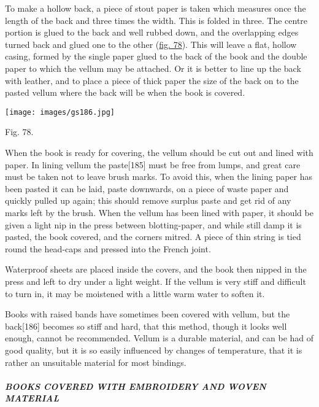 \documentclass[
]{article}
\begin{document}
To make a hollow back, a piece of stout paper is taken which measures
once the length of the back and three times the width. This is folded in
three. The centre portion is glued to the back and well rubbed down, and
the overlapping edges turned back and glued one to the other
(\protect\hyperlink{Fig_78}{fig. 78}). This will leave a flat, hollow
casing, formed by the single paper glued to the back of the book and the
double paper to which the vellum may be attached. Or it is better to
line up the back with leather, and to place a piece of thick paper the
size of the back on to the pasted vellum where the back will be when the
book is covered.

\protect\hypertarget{Fig_78}{}{}
\texttt{[image: images/gs186.jpg]}

Fig. 78.

When the book is ready for covering, the vellum should be cut out and
lined with paper. In lining vellum the
paste{\protect\hypertarget{Page_185}{}{{[}185{]}}} must be free from
lumps, and great care must be taken not to leave brush marks. To avoid
this, when the lining paper has been pasted it can be laid, paste
downwards, on a piece of waste paper and quickly pulled up again; this
should remove surplus paste and get rid of any marks left by the brush.
When the vellum has been lined with paper, it should be given a light
nip in the press between blotting-paper, and while still damp it is
pasted, the book covered, and the corners mitred. A piece of thin string
is tied round the head-caps and pressed into the French joint.

Waterproof sheets are placed inside the covers, and the book then nipped
in the press and left to dry under a light weight. If the vellum is very
stiff and difficult to turn in, it may be moistened with a little warm
water to soften it.

Books with raised bands have sometimes been covered with vellum, but the
back{\protect\hypertarget{Page_186}{}{{[}186{]}}} becomes so stiff and
hard, that this method, though it looks well enough, cannot be
recommended. Vellum is a durable material, and can be had of good
quality, but it is so easily influenced by changes of temperature, that
it is rather an unsuitable material for most bindings.

\hypertarget{books-covered-with-embroidery-and-woven-material}{%
\subparagraph{BOOKS COVERED WITH EMBROIDERY AND WOVEN
MATERIAL}\label{books-covered-with-embroidery-and-woven-material}}
\end{document}
